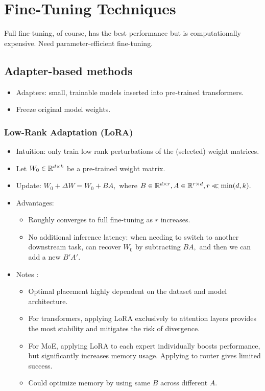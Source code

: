 \section{Fine-Tuning Techniques}

Full fine-tuning, of course, has the best performance but is computationally expensive. Need parameter-efficient fine-tuning.

\subsection{Adapter-based methods}
\begin{itemize}
    \item Adapters: small, trainable models inserted into pre-trained transformers.
    \item Freeze original model weights.
\end{itemize}

\subsubsection{Low-Rank Adaptation (LoRA) \cite{lora}}
\begin{itemize}
    \item Intuition: only train low rank perturbations of the (selected) weight matrices.
    \item Let $W_0 \in \mathbb{R}^{d \times k}$ be a pre-trained weight matrix.
    \item Update: $W_0 + \Delta W = W_0 + BA,$ where $B \in \mathbb{R}^{d \times r}, A \in \mathbb{R}^{r \times d}, r \ll \min(d,k).$
    \item Advantages:
    \begin{itemize}
        \item Roughly converges to full fine-tuning as $r$ increases.
        \item No additional inference latency: when needing to switch to another downstream task, can recover $W_0$ by subtracting $BA,$ and then we can add a new $B'A'.$
    \end{itemize}
    \item Notes \cite{lora_notes}:
    \begin{itemize}
        \item Optimal placement highly dependent on the dataset and model architecture.
        \item For transformers, applying LoRA exclusively to attention layers provides the most stability and mitigates the risk of divergence.
        \item For MoE, applying LoRA to each expert individually boosts performance, but significantly increases memory usage. Applying to router gives limited success.
        \item Could optimize memory by using same $B$ across different $A.$
    \end{itemize}
\end{itemize}